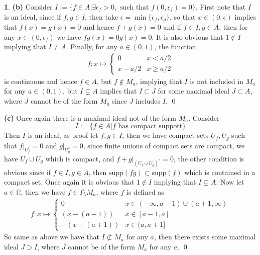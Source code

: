 \documentclass[11pt]{article}
\theoremstyle{definition}
\newtheorem{pb}{}
\newcommand{\set}[1]{\{#1\}}
\begin{document}
\begin{pb}
        \textbf{(b)} Consider \(I := \set{f \in A \vert \exists \epsilon_f > 0, \text{ such that } f(0,\epsilon_f) = 0}\). First note that \(I\) is an ideal, since if \(f,g \in I\), then take
        \(\epsilon = \min\set{\epsilon_f,\epsilon_g}\), so that \(x \in (0,\epsilon)\) implies that \(f(x) = g(x) = 0\) and hence \(f+g(x) = 0\) and if \(f \in I, g \in A\), then for any \(x \in(0,\epsilon_f)\) we have \(fg(x) = 0g(x) = 0\). It is also obvious that \(1 \not \in I\) implying that \(I \neq A\). Finally, for any \(a \in (0,1)\), the function
        \begin{align*}
            f:x \mapsto \begin{cases}
                0 & x < a/2 \\
                x- a/2 & x \geq a/2
            \end{cases}
        \end{align*}
        is continuous and hence \(f \in A\), but \(f \not \in M_a\), implying that \(I\) is not included in \(M_a\) for any \(a \in (0,1)\), but \(I \subsetneq A\) implies that \(I \subset J\) for some maximal ideal \(J \subset A\), where \(J\) cannot be of the form \(M_a\) since \(J\) includes \(I\). \qed

        \textbf{(c)} Once again there is a maximal ideal not of the form \(M_a\).
        Consider \[I := \set{f \in A \vert f \text{ has compact support}}\]
        Then \(I\) is an ideal, as proof let \(f,g \in I\), then we have compact sets \(U_f,U_g\) such that \(f \vert_{U_f^c} = 0\) and \(g \vert_{U_g^c} = 0\), since finite unions of compact sets are compact, we have \(U_f \cup U_g\) which is compact, and \(f + g\vert_{(U_f \cup U_g)^c} = 0\), the other condition is obvious since if \(f \in I, g \in A\), then
        \(\text{supp}(fg) \subset \text{supp}(f)\) which is contained in a compact set. Once again it is obvious that \(1 \not \in I\) implying that \(I \subsetneq A\). Now let \(a \in \mathbb{R}\), then we have \(f \in I \setminus M_a\), where \(f\) is defined as
        \begin{align*}
            f: x\mapsto \begin{cases}
                0 & x \in (-\infty, a-1) \cup (a+1,\infty) \\
                (x - (a-1)) & x \in [a-1,a] \\
                -(x - (a+1)) & x \in (a,a+1]
            \end{cases}
        \end{align*}
        So same as above we have that \(I \not \subset M_a\) for any \(a\), then there exists some maximal ideal \(J \supset I\), where \(J\) cannot be of the form \(M_a\) for any \(a\). \qed
    \end{pb}
\end{document}
